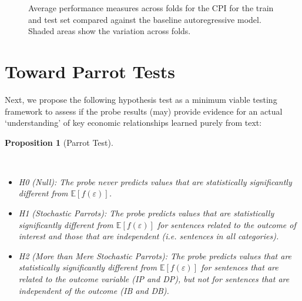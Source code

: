 \documentclass{article}
\theoremstyle{plain}
\newtheorem{proposition}[theorem]{Proposition}
\theoremstyle{definition}
\theoremstyle{remark}
\begin{document}
\begin{figure}


\caption{\label{fig-cpi}Average performance measures across folds for the CPI for the train and test set compared against the baseline autoregressive model. Shaded areas show the variation across folds.}

\end{figure}%

\section{Toward Parrot Tests}

Next, we propose the following hypothesis test as a minimum viable testing framework to assess if the probe results (may) provide evidence for an actual `understanding' of key economic relationships learned purely from text:

\begin{proposition}[Parrot
Test]\protect\hypertarget{prp-line}{}\label{prp-line}

~

\begin{itemize}
\setlength\itemsep{1px}
\item
  \emph{H0 (Null)}: The probe never predicts values that are statistically significantly different from \(\mathbb{E}[f(\varepsilon)]\).
\item
  \emph{H1 (Stochastic Parrots)}: The probe predicts values that are statistically significantly different from \(\mathbb{E}[f(\varepsilon)]\) for sentences related to the outcome of interest \emph{and} those that are independent (i.e. sentences in all categories).
\item
  \emph{H2 (More than Mere Stochastic Parrots)}: The probe predicts values that are statistically significantly different from \(\mathbb{E} [f(\varepsilon)]\) for sentences that are related to the outcome variable (IP and DP), but not for sentences that are independent of the outcome (IB and DB).
\end{itemize}
\end{proposition}
\end{document}
